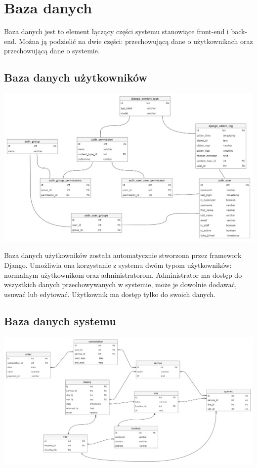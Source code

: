\section{Baza danych}

\hspace{0.5cm} Baza danych jest to element łączący części systemu stanowiące front-end i back-end. Można ją podzielić na dwie części: przechowującą dane o użytkownikach oraz przechowującą dane o systemie. 

\subsection{Baza danych użytkowników}
\begin{center}
    \includegraphics[scale=0.35]{user_database_schema.png}
\end{center}

Baza danych użytkowników została automatycznie stworzona przez framework Django. Umożliwia ona korzystanie z systemu dwóm typom użytkowników: normalnym użytkownikom oraz administratorom. Administrator ma dostęp do wszystkich danych przechowywanych w systemie, może je dowolnie dodawać, usuwać lub edytować. Użytkownik ma dostęp tylko do swoich danych. 

\subsection{Baza danych systemu}
\begin{center}
    \includegraphics[scale=0.35]{system_database_schema.png}
\end{center}

